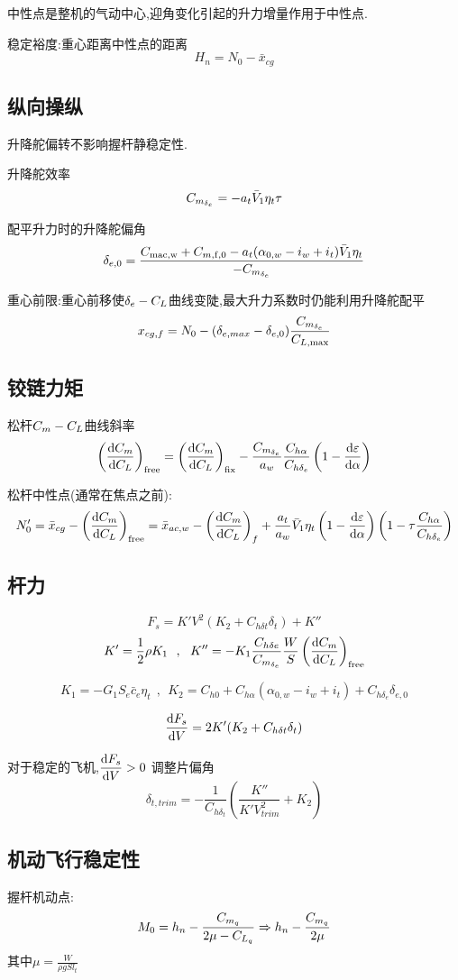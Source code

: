 中性点是整机的气动中心,迎角变化引起的升力增量作用于中性点.

稳定裕度:重心距离中性点的距离
$$H_n=N_0-\bar{x}_{cg}$$

\subsection{纵向操纵}
升降舵偏转不影响握杆静稳定性.

升降舵效率
$$C_{m_{\delta_e}}=-a_t\bar{V}_1\eta_t\tau$$

配平升力时的升降舵偏角
$$\delta_{e,0}=\frac{C_{\mathrm{mac,w}}+C_{m,\mathrm{f,0}}-a_t(\alpha_{0,w}-i_w+i_t)\bar{V}_1\eta_t}{-C_{m_{\delta_e}}}$$

重心前限:重心前移使$\delta_e - {C_L}$曲线变陡,最大升力系数时仍能利用升降舵配平
$$x_{cg,f}=N_0-(\delta_{e,max}-\delta_{e,0})\frac{C_{m_{\delta_e}}}{C_{L,\mathrm{max}}}$$

\subsection{铰链力矩}
松杆${C_m} - {C_L}$曲线斜率
$$\left(\frac{\operatorname{d\!} {C_m}}{\operatorname{d\!} {C_L}}\right)_{\mathrm{free}}=\left(\frac{\operatorname{d\!} {C_m}}{\operatorname{d\!} {C_L}}\right)_{\mathrm{fix}}-\frac{C_{m_{\delta_e}}}{a_w}\frac{C_{h\alpha}}{C_{h\delta_e}}\left(1-\frac{\operatorname{d\!} {\varepsilon}}{\operatorname{d\!} \alpha}\right)$$

松杆中性点(通常在焦点之前):
$$N_0'=\bar{x}_{cg}-\left(\frac{\operatorname{d\!} {C_m}}{\operatorname{d\!} {C_L}}\right)_{\mathrm{free}}=\bar{x}_{ac,w}-\left(\frac{\operatorname{d\!} {C_m}}{\operatorname{d\!} {C_L}}\right)_f+\frac{a_t}{a_w}\bar{V}_1 \eta_t\left(1-\frac{\operatorname{d\!} {\varepsilon}}{\operatorname{d\!} \alpha}\right)\left(1-\tau\frac{C_{h\alpha}}{C_{h\delta_e}}\right)$$
\clearpage
\subsection{杆力}
$$F_s=K'V^2(K_2+C_{h\delta t}\delta_t)+K''$$
$$K'=\frac{1}{2}\rho K_1\ \ ,\ \ K''=-K_1 \frac{C_{h\delta e}}{C_{m_{\delta_e}}}\frac{W}{S}\left(\frac{\operatorname{d\!} {C_m}}{\operatorname{d\!}{C_L}}\right)_{\mathrm{free}}$$

$$K_1=-G_1S_e\bar{c}_e\eta_t\ \ ,\ \ K_2=C_{h0}+C_{h\alpha}(\alpha_{0,w}-i_w+i_t)+C_{h\delta_e}\delta_{e,0}$$

$$\frac{\operatorname{d\!} F_s}{\operatorname{d\!} V}=2K'(K_2+C_{h\delta t}\delta_t)$$

对于稳定的飞机,$\displaystyle \frac{\operatorname{d\!} F_s}{\operatorname{d\!} V}>0$
调整片偏角
$$\delta_{t,trim}=-\frac{1}{C_{h\delta_t}}\left(\frac{K''}{K'V^2_{trim}}+K_2\right)$$

\subsection{机动飞行稳定性}
握杆机动点:
$$M_0=h_n-\frac{C_{m_q}}{2\mu-{C_{L_q}}}\Rightarrow h_n-\frac{C_{m_q}}{2\mu}$$
其中$\displaystyle \mu=\frac{W}{\rho g S l_t}$

